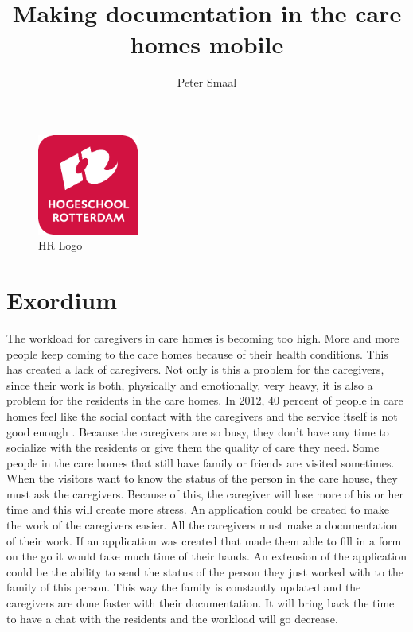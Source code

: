 \documentclass[12pt, a4paper]{article}
\begin{document}
\newcommand*{\myfont}{\fontfamily{phv}\selectfont}
\title{Making documentation in the care homes mobile}
\author{Peter Smaal}
\maketitle

\begin{figure}
\centering
\includegraphics[width=33mm]{Hogeschool-Rotterdam-Logo.pdf}
\caption{HR Logo}
\label{fig: HROlogo}
\end{figure}


\newpage
\myfont{\tableofcontents}
\newpage


\section{Exordium}
The workload for caregivers in care homes is becoming too high. More and more people keep coming to the care homes because of their health conditions. This has created a lack of caregivers. Not only is this a problem for the caregivers, since their work is both, physically and emotionally, very heavy, it is also a problem for the residents in the care homes.
In 2012, 40 percent of people in care homes feel like the social contact with the caregivers and the service itself is not good enough \cite{bowman:reasoning}. Because the caregivers are so busy, they don’t have any time to socialize with the residents or give them the quality of care they need.
Some people in the care homes that still have family or friends are visited sometimes. When the visitors want to know the status of the person in the care house, they must ask the caregivers. Because of this, the caregiver will lose more of his or her time and this will create more stress.
An application could be created to make the work of the caregivers easier. All the caregivers must make a documentation of their work. If an application was created that made them able to fill in a form on the go it would take much time of their hands. An extension of the application could be the ability to send the status of the person they just worked with to the family of this person. This way the family is constantly updated and the caregivers are done faster with their documentation. It will bring back the time to have a chat with the residents and the workload will go decrease.
\end{document}
